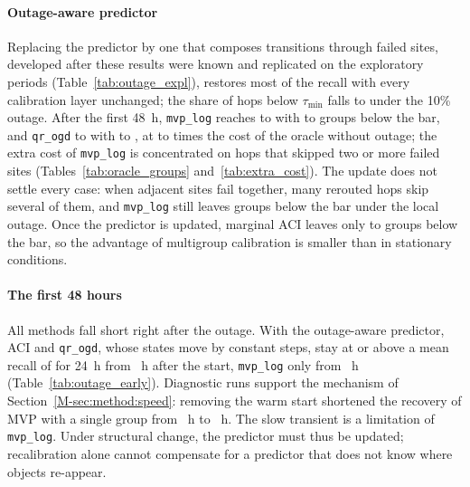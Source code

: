 \paragraph*{Outage-aware predictor}
Replacing the predictor by one that composes transitions through failed sites,
developed after these results were known and replicated on the exploratory
periods (Table~\ref{tab:outage_expl}), restores most of the recall with every
calibration layer unchanged; the share of hops below $\tau_{\min}$ falls to
\ceilTenAwareAll{} under the 10\% outage. After the first 48~h, \texttt{mvp\_log} reaches
\outThirtyAwareMvpLogRecall{} to \outTenAwareMvpLogRecall{} with
\outTenAwareMvpLogBelowBar{} to \outThirtyAwareMvpLogBelowBar{} groups below the
bar, and \texttt{qr\_ogd} \outThirtyAwareQrOgdRecall{} to \outTenAwareQrOgdRecall{}
with \outThirtyAwareQrOgdBelowBar{} to \outTenAwareQrOgdBelowBar, at
\outTenAwareMvpLogCostRatio{} to \outThirtyAwareMvpLogCostRatio{} times the cost of
the oracle without outage; the extra cost of \texttt{mvp\_log} is concentrated on hops that skipped two
or more failed sites (Tables~\ref{tab:oracle_groups} and~\ref{tab:extra_cost}). The update does not settle
every case: when adjacent sites fail together, many rerouted hops skip several of
them, and \texttt{mvp\_log} still leaves \outRegionAwareMvpLogBelowBar{} groups
below the bar under the local outage. Once the predictor is updated, marginal ACI
leaves only \outThirtyAwareAciBelowBar{} to \outTenAwareAciBelowBar{} groups below
the bar, so the advantage of multigroup calibration is smaller than in stationary
conditions.

\paragraph*{The first 48 hours}
All methods fall short right after the outage. With the outage-aware predictor,
ACI and \texttt{qr\_ogd}, whose states move by constant steps, stay at or above a
mean recall of \groupBar{} for 24~h from \recovAwareFastHours~h after the start,
\texttt{mvp\_log} only from \recovAwareMvpLogHours~h (Table~\ref{tab:outage_early}).
Diagnostic runs support the mechanism of Section~\ref{M-sec:method:speed}: removing
the warm start shortened the recovery of MVP with a single group from
\warmMvpGlobalRecoverHours~h to \warmZeroMvpGlobalRecoverHours~h. The slow
transient is a limitation of \texttt{mvp\_log}. Under structural change, the
predictor must thus be updated; recalibration alone cannot compensate for a
predictor that does not know where objects re-appear.




